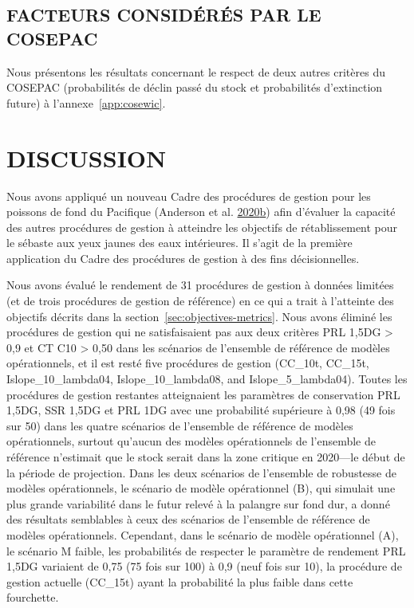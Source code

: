 \documentclass[french,11pt]{book}
\begin{document}
\hypertarget{facteurs-considuxe9ruxe9s-par-le-cosepac}{%
\subsection{FACTEURS CONSIDÉRÉS PAR LE COSEPAC}\label{facteurs-considuxe9ruxe9s-par-le-cosepac}}

Nous présentons les résultats concernant le respect de deux autres critères du COSEPAC (probabilités de déclin passé du stock et probabilités d'extinction future) à l'annexe~\ref{app:cosewic}.

\hypertarget{sec:discussion}{%
\section{DISCUSSION}\label{sec:discussion}}

Nous avons appliqué un nouveau Cadre des procédures de gestion pour les poissons de fond du Pacifique (Anderson et al. \protect\hyperlink{ref-anderson2020gfmp}{2020}\protect\hyperlink{ref-anderson2020gfmp}{b}) afin d'évaluer la capacité des autres procédures de gestion à atteindre les objectifs de rétablissement pour le sébaste aux yeux jaunes des eaux intérieures. Il s'agit de la première application du Cadre des procédures de gestion à des fins décisionnelles.

Nous avons évalué le rendement de 31 procédures de gestion à données limitées (et de trois procédures de gestion de référence) en ce qui a trait à l'atteinte des objectifs décrits dans la section~\ref{sec:objectives-metrics}. Nous avons éliminé les procédures de gestion qui ne satisfaisaient pas aux deux critères PRL 1,5DG \textgreater{} 0,9 et CT C10 \textgreater{} 0,50 dans les scénarios de l'ensemble de référence de modèles opérationnels, et il est resté five procédures de gestion (CC\_10t, CC\_15t, Islope\_10\_lambda04, Islope\_10\_lambda08, and Islope\_5\_lambda04). Toutes les procédures de gestion restantes atteignaient les paramètres de conservation PRL 1,5DG, SSR 1,5DG et PRL 1DG avec une probabilité supérieure à 0,98 (49 fois sur 50) dans les quatre scénarios de l'ensemble de référence de modèles opérationnels, surtout qu'aucun des modèles opérationnels de l'ensemble de référence n'estimait que le stock serait dans la zone critique en 2020---le début de la période de projection. Dans les deux scénarios de l'ensemble de robustesse de modèles opérationnels, le scénario de modèle opérationnel (B), qui simulait une plus grande variabilité dans le futur relevé à la palangre sur fond dur, a donné des résultats semblables à ceux des scénarios de l'ensemble de référence de modèles opérationnels. Cependant, dans le scénario de modèle opérationnel (A), le scénario M faible, les probabilités de respecter le paramètre de rendement PRL 1,5DG variaient de 0,75 (75 fois sur 100) à 0,9 (neuf fois sur 10), la procédure de gestion actuelle (CC\_15t) ayant la probabilité la plus faible dans cette fourchette.
\end{document}
